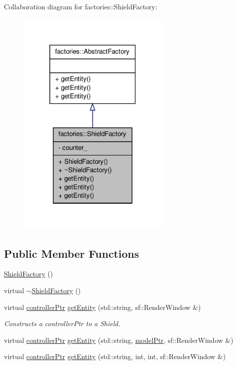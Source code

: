 \-Collaboration diagram for factories\-:\-:\-Shield\-Factory\-:\nopagebreak
\begin{figure}[H]
\begin{center}
\leavevmode
\includegraphics[width=210pt]{d2/d57/classfactories_1_1ShieldFactory__coll__graph}
\end{center}
\end{figure}
\subsection*{\-Public \-Member \-Functions}
\begin{DoxyCompactItemize}
\item 
\hyperlink{classfactories_1_1ShieldFactory_a871347e84fb1b0ed8c10049c7dd3fe99}{\-Shield\-Factory} ()
\item 
virtual \hyperlink{classfactories_1_1ShieldFactory_afe2d2a980b7b6a5394002bccf0d0a48e}{$\sim$\-Shield\-Factory} ()
\item 
virtual \hyperlink{Game_8h_a21b04f6cf2d5990b82725fac5ea2ce9a}{controller\-Ptr} \hyperlink{classfactories_1_1ShieldFactory_a32b4bc425dc0854110fa9dbf18663c7c}{get\-Entity} (std\-::string, sf\-::\-Render\-Window \&)
\begin{DoxyCompactList}\small\item\em \-Constructs a controller\-Ptr to a \-Shield. \end{DoxyCompactList}\item 
virtual \hyperlink{Game_8h_a21b04f6cf2d5990b82725fac5ea2ce9a}{controller\-Ptr} \hyperlink{classfactories_1_1ShieldFactory_a8752c0c8b1f9a39139aa948ec13a737b}{get\-Entity} (std\-::string, \hyperlink{ModelView_8h_a78966ddb517fca8d2b29a2bc5c31e74e}{model\-Ptr}, sf\-::\-Render\-Window \&)
\item 
virtual \hyperlink{Game_8h_a21b04f6cf2d5990b82725fac5ea2ce9a}{controller\-Ptr} \hyperlink{classfactories_1_1ShieldFactory_ae7c23542c065b4340474af3f9c0ad598}{get\-Entity} (std\-::string, int, int, sf\-::\-Render\-Window \&)
\end{DoxyCompactItemize}
